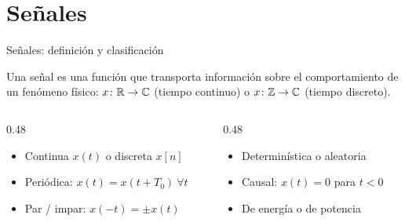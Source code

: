 \section{Señales}

\begin{frame}{Señales: definición y clasificación}
  \begin{definicion}
    Una \alert{señal} es una función que transporta información sobre el
    comportamiento de un fenómeno físico: $x\colon \mathbb{R} \to \mathbb{C}$ (tiempo continuo)
    o $x\colon \mathbb{Z} \to \mathbb{C}$ (tiempo discreto).
  \end{definicion}

  \begin{columns}[T]
    \begin{column}{0.48\textwidth}
      \begin{itemize}
        \item Continua $x(t)$ o discreta $x[n]$
        \item Periódica: $x(t) = x(t + T_0)\ \forall t$
        \item Par / impar: $x(-t) = \pm x(t)$
      \end{itemize}
    \end{column}
    \begin{column}{0.48\textwidth}
      \begin{itemize}
        \item Determinística o aleatoria
        \item Causal: $x(t) = 0$ para $t < 0$
        \item De energía o de potencia
      \end{itemize}
    \end{column}
  \end{columns}
\end{frame}

